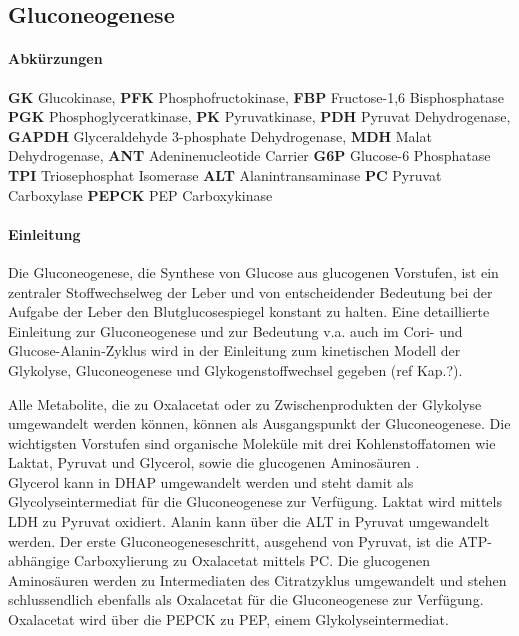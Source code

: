 \subsection{Gluconeogenese}
\paragraph{Abkürzungen}
  \small
  \textbf{GK} Glucokinase,
  \textbf{PFK} Phosphofructokinase,
  \textbf{FBP} Fructose-1,6 Bisphosphatase
  \textbf{PGK} Phosphoglyceratkinase,
  \textbf{PK} Pyruvatkinase,
  \textbf{PDH} Pyruvat Dehydrogenase,
  \textbf{GAPDH} Glyceraldehyde 3-phosphate Dehydrogenase,
  \textbf{MDH} Malat Dehydrogenase,
  \textbf{ANT} Adeninenucleotide Carrier
  \textbf{G6P} Glucose-6 Phosphatase
  \textbf{TPI} Triosephosphat Isomerase
  \textbf{ALT} Alanintransaminase 
  \textbf{PC} Pyruvat Carboxylase
  \textbf{PEPCK} PEP Carboxykinase 
  \normalsize

\paragraph{Einleitung}
Die Gluconeogenese, die Synthese von Glucose aus glucogenen Vorstufen, ist ein zentraler Stoffwechselweg der Leber und von entscheidender Bedeutung bei der Aufgabe der Leber den Blutglucosespiegel konstant zu halten. Eine detaillierte Einleitung zur Gluconeogenese und zur Bedeutung v.a. auch im Cori- und Glucose-Alanin-Zyklus wird in der Einleitung zum kinetischen Modell der Glykolyse, Gluconeogenese und Glykogenstoffwechsel gegeben (ref Kap.?).

Alle Metabolite, die zu Oxalacetat oder zu Zwischenprodukten der Glykolyse umgewandelt werden können, können als Ausgangspunkt der Gluconeogenese. Die wichtigsten Vorstufen sind organische Moleküle mit drei Kohlenstoffatomen wie Laktat, Pyruvat und Glycerol, sowie die glucogenen Aminosäuren \cite{Nelson2008}.\\
Glycerol kann in DHAP umgewandelt werden und steht damit als Glycolyseintermediat für die Gluconeogenese zur Verfügung.
Laktat wird mittels LDH zu Pyruvat oxidiert. Alanin kann über die ALT in Pyruvat umgewandelt werden.
Der erste Gluconeogeneseschritt, ausgehend von Pyruvat, ist die ATP-abhängige Carboxylierung zu Oxalacetat mittels PC. Die glucogenen Aminosäuren werden zu Intermediaten des Citratzyklus umgewandelt und stehen schlussendlich ebenfalls als Oxalacetat für die Gluconeogenese zur Verfügung. Oxalacetat wird über die PEPCK zu PEP, einem Glykolyseintermediat.

